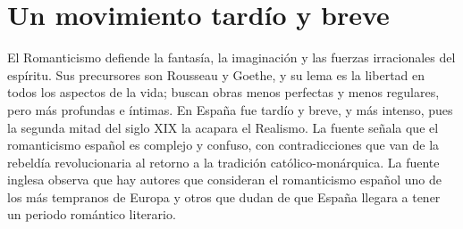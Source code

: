 \documentclass{book}
\begin{document}
\section{Un movimiento tardío y breve}

El Romanticismo defiende la fantasía, la imaginación y las fuerzas irracionales del espíritu. Sus precursores son Rousseau y Goethe, y su lema es la libertad en todos los aspectos de la vida; buscan obras menos perfectas y menos regulares, pero más profundas e íntimas. En España fue tardío y breve, y más intenso, pues la segunda mitad del siglo XIX la acapara el Realismo. La fuente señala que el romanticismo español es complejo y confuso, con contradicciones que van de la rebeldía revolucionaria al retorno a la tradición católico-monárquica. La fuente inglesa observa que hay autores que consideran el romanticismo español uno de los más tempranos de Europa y otros que dudan de que España llegara a tener un periodo romántico literario.

\end{document}
